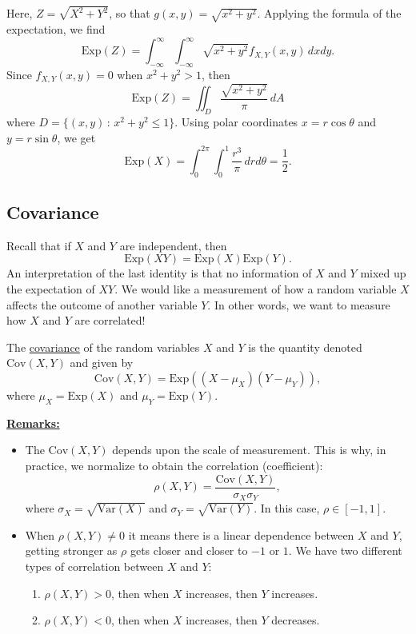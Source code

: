 \begin{sol*}
Here, $Z = \sqrt{X^2 + Y^2}$, so that $g (x, y) = \sqrt{x^2 + y^2}$. Applying the formula of the expectation, we find
    \[
        \mathrm{Exp} (Z) = \int_{-\infty}^\infty \int_{-\infty}^\infty \sqrt{x^2 + y^2} f_{X, Y} (x, y) \, dx dy .
    \]
Since $f_{X, Y} (x, y) = 0$ when $x^2 + y^2 > 1$, then
    \[
        \mathrm{Exp} (Z) = \iint_{D} \frac{\sqrt{x^2 + y^2}}{\pi} \, dA 
    \]
where $D = \{ (x, y) \, : \, x^2 + y^2 \leq 1 \}$. Using polar coordinates $x = r \cos \theta$ and $y = r \sin \theta$, we get
    \[
        \mathrm{Exp} (X) = \int_0^{2\pi} \int_0^1 \frac{r^3}{\pi} \, dr d\theta = \frac{1}{2} . \tag*{$\triangle$}
    \]
\end{sol*}

\subsection*{Covariance}

Recall that if $X$ and $Y$ are independent, then
    \[
        \mathrm{Exp} (XY) = \mathrm{Exp} (X) \mathrm{Exp} (Y) .
    \]
An interpretation of the last identity is that no information of $X$ and $Y$ mixed up the expectation of $XY$. We would like a measurement of how a random variable $X$ affects the outcome of another variable $Y$. In other words, we want to measure how $X$ and $Y$ are correlated!

\begin{definition}
The \underline{covariance} of the random variables $X$ and $Y$ is the quantity denoted $\mathrm{Cov} (X, Y)$ and given by
    \[
        \mathrm{Cov} (X, Y) = \mathrm{Exp} ( (X - \mu_X ) (Y - \mu_Y)),
    \]
where $\mu_X = \mathrm{Exp} (X)$ and $\mu_Y = \mathrm{Exp} (Y)$.
\end{definition}

\underline{\textbf{Remarks:}}
    \begin{itemize}
        \item The $\mathrm{Cov} (X, Y)$ depends upon the scale of measurement. This is why, in practice, we normalize to obtain the correlation (coefficient):
            \[
                \rho (X, Y) = \frac{\mathrm{Cov} (X, Y)}{\sigma_X \sigma_Y},
            \]
        where $\sigma_X = \sqrt{\mathrm{Var} (X)}$ and $\sigma_Y = \sqrt{\mathrm{Var} (Y)}$. In this case, $\rho \in [-1, 1]$. 
        \item When $\rho (X, Y) \neq 0$ it means there is a linear dependence between $X$ and $Y$, getting stronger as $\rho$ gets closer and closer to $-1$ or $1$. We have two different types of correlation between $X$ and $Y$:
            \begin{enumerate}[label=\arabic*)]
                \item $\rho (X, Y) > 0$, then when $X$ increases, then $Y$ increases.
                \item $\rho (X, Y) < 0$, then when $X$ increases, then $Y$ decreases.
            \end{enumerate}
    \end{itemize}

